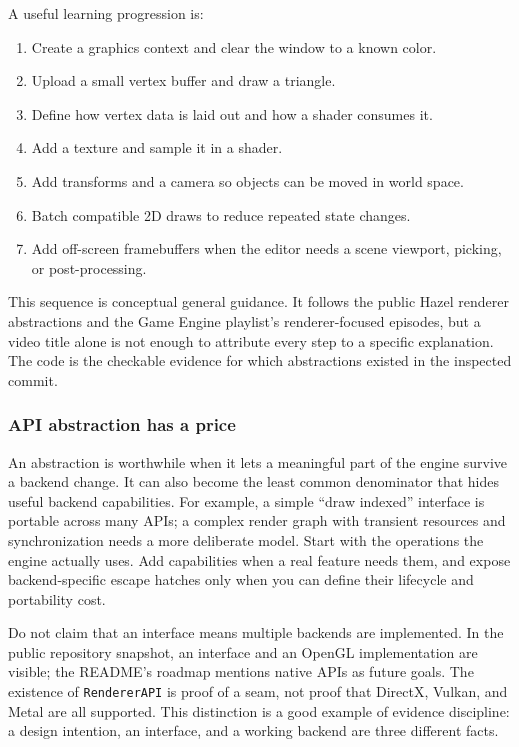 A useful learning progression is:

\begin{enumerate}
\def\labelenumi{\arabic{enumi}.}
\tightlist
\item
  Create a graphics context and clear the window to a known color.
\item
  Upload a small vertex buffer and draw a triangle.
\item
  Define how vertex data is laid out and how a shader consumes it.
\item
  Add a texture and sample it in a shader.
\item
  Add transforms and a camera so objects can be moved in world space.
\item
  Batch compatible 2D draws to reduce repeated state changes.
\item
  Add off-screen framebuffers when the editor needs a scene viewport, picking, or post-processing.
\end{enumerate}

This sequence is conceptual general guidance. It follows the public Hazel renderer abstractions and the Game Engine playlist's renderer-focused episodes, but a video title alone is not enough to attribute every step to a specific explanation. The code is the checkable evidence for which abstractions existed in the inspected commit.

\subsubsection{API abstraction has a price}\label{06-engine-ii-ch025-api-abstraction-has-a-price}

An abstraction is worthwhile when it lets a meaningful part of the engine survive a backend change. It can also become the least common denominator that hides useful backend capabilities. For example, a simple ``draw indexed'' interface is portable across many APIs; a complex render graph with transient resources and synchronization needs a more deliberate model. Start with the operations the engine actually uses. Add capabilities when a real feature needs them, and expose backend-specific escape hatches only when you can define their lifecycle and portability cost.

Do not claim that an interface means multiple backends are implemented. In the public repository snapshot, an interface and an OpenGL implementation are visible; the README's roadmap mentions native APIs as future goals. The existence of \texttt{RendererAPI} is proof of a seam, not proof that DirectX, Vulkan, and Metal are all supported. This distinction is a good example of evidence discipline: a design intention, an interface, and a working backend are three different facts.

